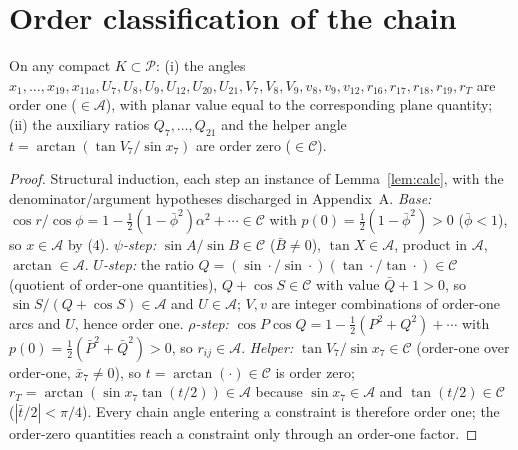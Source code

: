 \documentclass[11pt]{article}
\theoremstyle{definition}\newtheorem{definition}{Definition}\newtheorem{remark}{Remark}
\begin{document}
\section{Order classification of the chain}
\begin{lemma}[Classification]\label{lem:chain}
On any compact $K\subset\mathcal P$:
\textup{(i)} the angles $x_1,\dots,x_{19},x_{11a},U_7,U_8,U_9,U_{12},U_{20},U_{21},
V_7,V_8,V_9,v_8,v_9,v_{12},r_{16},r_{17},r_{18},r_{19},r_T$ are order one
($\in\mathcal A$), with planar value equal to the corresponding plane quantity;
\textup{(ii)} the auxiliary ratios $Q_7,\dots,Q_{21}$ and the helper angle
$t=\arctan(\tan V_7/\sin x_7)$ are order zero ($\in\mathcal C$).
\end{lemma}
\begin{proof}
Structural induction, each step an instance of Lemma~\ref{lem:calc}, with the
denominator/argument hypotheses discharged in Appendix~A. \emph{Base:}
$\cos r/\cos\phi=1-\tfrac12(1-\bar\phi^2)\alpha^2+\cdots\in\mathcal C$ with
$p(0)=\tfrac12(1-\bar\phi^2)>0$ ($\bar\phi<1$), so $x\in\mathcal A$ by (4).
\emph{$\psi$-step:} $\sin A/\sin B\in\mathcal C$ ($\bar B\neq0$), $\tan X\in\mathcal A$,
product in $\mathcal A$, $\arctan\in\mathcal A$. \emph{$U$-step:} the ratio
$Q=(\sin\cdot/\sin\cdot)(\tan\cdot/\tan\cdot)\in\mathcal C$ (quotient of order-one
quantities), $Q+\cos S\in\mathcal C$ with value $\bar Q+1>0$, so
$\sin S/(Q+\cos S)\in\mathcal A$ and $U\in\mathcal A$; $V,v$ are integer combinations
of order-one arcs and $U$, hence order one. \emph{$\rho$-step:}
$\cos P\cos Q=1-\tfrac12(P^2+Q^2)+\cdots$ with $p(0)=\tfrac12(\bar P^2+\bar Q^2)>0$,
so $r_{ij}\in\mathcal A$. \emph{Helper:} $\tan V_7/\sin x_7\in\mathcal C$ (order-one
over order-one, $\bar x_7\neq0$), so $t=\arctan(\cdot)\in\mathcal C$ is order zero;
$r_T=\arctan(\sin x_7\tan(t/2))\in\mathcal A$ because $\sin x_7\in\mathcal A$ and
$\tan(t/2)\in\mathcal C$ ($|\bar t/2|<\pi/4$). Every chain angle entering a constraint
is therefore order one; the order-zero quantities reach a constraint only through an
order-one factor.
\end{proof}
\end{document}
